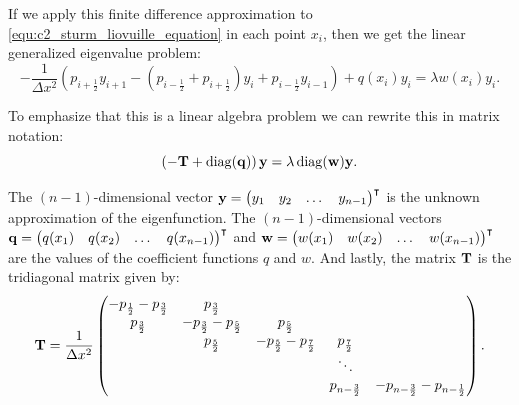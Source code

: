 If we apply this finite difference approximation to \eqref{equ:c2_sturm_liovuille_equation} in each point $x_i$, then we get the linear generalized eigenvalue problem:
$$
    -\frac{1}{\Delta x^2}\left(p_{i+\frac{1}{2}} y_{i+1} - \left(p_{i-\frac{1}{2}} + p_{i+\frac{1}{2}}\right) y_i + p_{i-\frac{1}{2}} y_{i-1}\right) + q(x_i) y_i = \lambda w(x_i) y_i \text{.}
$$

To emphasize that this is a linear algebra problem we can rewrite this in matrix notation:
\begin{equation}\label{equ:c2_finite_difference_matrix_problem}
    \left(-\vb{T} + \operatorname{diag}(\vb{q})\right)\vb{y} = \lambda \operatorname{diag}(\vb{w}) \vb{y}\text{.}
\end{equation}

The $(n-1)$-dimensional vector $\vb{y} = {\begin{pmatrix}y_1 & y_2 & \dots & y_{n-1}\end{pmatrix}}^\intercal$ is the unknown approximation of the eigenfunction. The $(n-1)$-dimensional vectors $\vb{q} = {\begin{pmatrix}q(x_1) & q(x_2) & \dots & q(x_{n-1})\end{pmatrix}}^\intercal$  and $\vb{w} = {\begin{pmatrix}w(x_1) & w(x_2) & \dots & w(x_{n-1})\end{pmatrix}}^\intercal$ are the values of the coefficient functions $q$ and $w$. And lastly, the matrix $\vb{T}$ is the tridiagonal matrix given by:
$$
    \vb{T} = \frac{1}{\Delta x^2}\begin{pmatrix}
        -p_{\frac{1}{2}} -p_{\frac{3}{2}} & p_{\frac{3}{2}}                   &                                   &                     &                                            \\
        p_{\frac{3}{2}}                   & -p_{\frac{3}{2}} -p_{\frac{5}{2}} & p_{\frac{5}{2}}                   &                     &                                            \\
                                          & p_{\frac{5}{2}}                   & -p_{\frac{5}{2}} -p_{\frac{7}{2}} & p_{\frac{7}{2}}     &                                            \\
                                          &                                   &                                   & \ddots              &                                            \\
                                          &                                   &                                   & p_{n - \frac{3}{2}} & -p_{n - \frac{3}{2}} - p_{n - \frac{1}{2}} \\
    \end{pmatrix}{}\text{.}
$$

